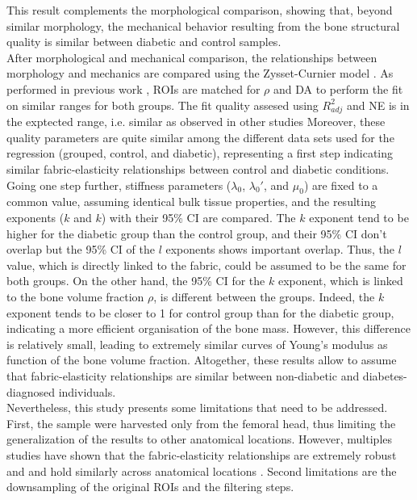 \documentclass[a4paper,fleqn]{DC_ArtStyle}
\begin{document}
	This result complements the morphological comparison, showing that, beyond similar morphology, the mechanical behavior resulting from the bone structural quality is similar between diabetic and control samples.
	\\[0.5em]
	After morphological and mechanical comparison, the relationships between morphology and mechanics are compared using the Zysset-Curnier model \cite{Zysset1995}.
	As performed in previous work \cite{Simon2022}, ROIs are matched for $\rho$ and DA to perform the fit on similar ranges for both groups.
	The fit quality assesed using $R_{adj}^{2}$ and NE is in the exptected range, i.e. similar as observed in other studies \cite{Gross2012, Panyasantisuk2015, Simon2022}
	Moreover, these quality parameters are quite similar among the different data sets used for the regression (grouped, control, and diabetic), representing a first step indicating similar fabric-elasticity relationships between control and diabetic conditions.
	Going one step further, stiffness parameters ($\lambda_0$, $\lambda_0'$, and $\mu_0$) are fixed to a common value, assuming identical bulk tissue properties, and the resulting exponents ($k$ and $k$) with their 95\% CI are compared.
	The $k$ exponent tend to be higher for the diabetic group than the control group, and their 95\% CI don't overlap but the 95\% CI of the $l$ exponents shows important overlap.
	Thus, the $l$ value, which is directly linked to the fabric, could be assumed to be the same for both groups.
	On the other hand, the 95\% CI for the $k$ exponent, which is linked to the bone volume fraction $\rho$, is different between the groups.
	Indeed, the $k$ exponent tends to be closer to 1 for control group than for the diabetic group, indicating a more efficient organisation of the bone mass.
	However, this difference is relatively small, leading to extremely similar curves of Young's modulus as function of the bone volume fraction.
	Altogether, these results allow to assume that fabric-elasticity relationships are similar between non-diabetic and diabetes-diagnosed individuals.
	\\[0.5em]
	Nevertheless, this study presents some limitations that need to be addressed.
	First, the sample were harvested only from the femoral head, thus limiting the generalization of the results to other anatomical locations.
	However, multiples studies have shown that the fabric-elasticity relationships are extremely robust and and hold similarly across anatomical locations \cite{Gross2012,Panyasantisuk2015,Simon2022}.
	Second limitations are the downsampling of the original ROIs and the filtering steps.
\end{document}

